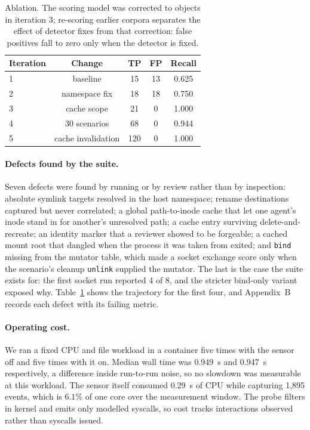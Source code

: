 \begin{table}[t]
\centering
\small
\begin{tabular}{@{}lcccc@{}}
\toprule
Iteration & Change & TP & FP & Recall \\
\midrule
1 & baseline            & 15  & 13 & 0.625 \\
2 & namespace fix       & 18  & 18 & 0.750 \\
3 & cache scope         & 21  & 0  & 1.000 \\
4 & 30 scenarios        & 68  & 0  & 0.944 \\
5 & cache invalidation  & 120 & 0  & 1.000 \\
\bottomrule
\end{tabular}
\caption{Ablation. The scoring model was corrected to objects in iteration 3;
re-scoring earlier corpora separates the effect of detector fixes from that
correction: false positives fall to zero only when the detector is fixed.}
\label{tab:ablation}
\end{table}

\paragraph{Defects found by the suite.} Seven defects were found by running or by
review rather than by inspection: absolute symlink targets resolved in the host
namespace; rename destinations captured but never correlated; a global
path-to-inode cache that let one agent's inode stand in for another's unresolved
path; a cache entry surviving delete-and-recreate; an identity marker that a
reviewer showed to be forgeable; a cached mount root that dangled when the process
it was taken from exited; and \texttt{bind} missing from the mutator table, which
made a socket exchange score only when the scenario's cleanup \texttt{unlink}
supplied the mutator. The last is the case the suite exists for: the first socket
run reported 4 of 8, and the stricter bind-only variant exposed why.
Table~\ref{tab:ablation} shows the trajectory for the first four, and
Appendix~B records each defect with its failing metric.

\paragraph{Operating cost.} We ran a fixed CPU and file workload in a container
five times with the sensor off and five times with it on. Median wall time was
0.949~s and 0.947~s respectively, a difference inside run-to-run noise, so no
slowdown was measurable at this workload. The sensor itself consumed 0.29~s of CPU
while capturing 1,895 events, which is $6.1\%$ of one core over the measurement
window. The probe filters in kernel and emits only modelled syscalls, so cost
tracks interactions observed rather than syscalls issued.

